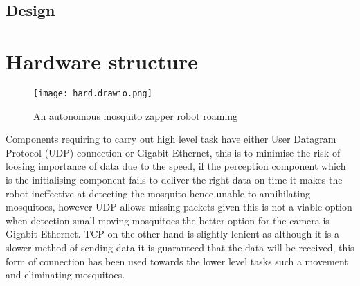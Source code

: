 \documentclass[11pt]{article}
\begin{document}
 
 

 	
 \subsection{Design}
 
 
 
 
 
 	\section{Hardware structure}
 	 
 	
 	\begin{center}
 		
 		
 		\begin{figure}[H]
 			\centering
 			\texttt{[image: hard.drawio.png]}
 			\caption{An autonomous mosquito zapper robot roaming }
 			\label{fig:robot}
 		\end{figure}
 	\end{center}
 
 Components requiring to carry out high level task have either User Datagram Protocol (UDP) connection or Gigabit Ethernet, this is to minimise the risk of loosing importance of data due to the speed, if the perception component which is the initialising component  fails to deliver the right data on time it makes the robot ineffective at detecting the mosquito hence unable to annihilating mosquitoes, however UDP allows missing packets given this is not a viable option when detection small moving mosquitoes the better option for the camera is Gigabit Ethernet. TCP on the other hand is slightly lenient as although it is a slower method of sending data it is guaranteed that the data will be received, this form of connection has been used towards the lower level tasks such a movement and eliminating mosquitoes.
 
 
 
\end{document}
